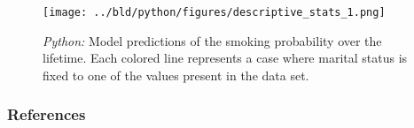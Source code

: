\documentclass[11pt, aspectratio=169]{beamer}
\begin{document}
\begin{frame}[t]
    \begin{figure}[H]

        \centering
        \texttt{[image: ../bld/python/figures/descriptive\_stats\_1.png]}

        \caption{\emph{Python:} Model predictions of the smoking probability over the
            lifetime. Each colored line represents a case where marital status is fixed to
            one of the values present in the data set.}
        \label{fig:python-predictions}

    \end{figure}
\end{frame}






 {
    \begin{frame}
        \frametitle{}
    \end{frame}

}

\begin{frame}[allowframebreaks]
    \frametitle{References}
    \renewcommand{\bibfont}{\normalfont\footnotesize}
    \printbibliography
\end{frame}
\end{document}
